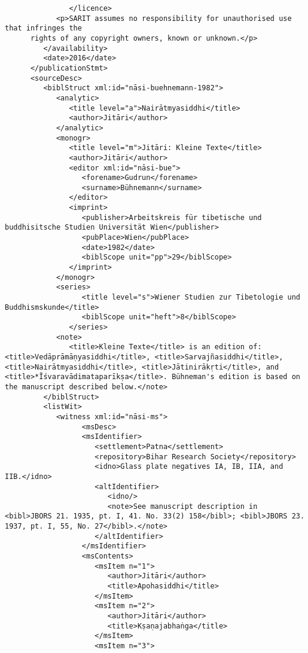 \documentclass[article,12pt,a4paper]{memoir}%
\begin{document}
\begin{verbatim}
	           </licence>
            <p>SARIT assumes no responsibility for unauthorised use that infringes the
	  rights of any copyright owners, known or unknown.</p>
         </availability>
         <date>2016</date>
      </publicationStmt>
      <sourceDesc>
         <biblStruct xml:id="nāsi-buehnemann-1982">
            <analytic>
               <title level="a">Nairātmyasiddhi</title>
               <author>Jitāri</author>
            </analytic>
            <monogr>
               <title level="m">Jitāri: Kleine Texte</title>
               <author>Jitāri</author>
               <editor xml:id="nāsi-bue">
                  <forename>Gudrun</forename> 
                  <surname>Bühnemann</surname>
               </editor>
               <imprint>
                  <publisher>Arbeitskreis für tibetische und buddhisitsche Studien Universität Wien</publisher>
                  <pubPlace>Wien</pubPlace>
                  <date>1982</date>
                  <biblScope unit="pp">29</biblScope>
               </imprint>
            </monogr>
            <series>
	              <title level="s">Wiener Studien zur Tibetologie und Buddhismskunde</title>
	              <biblScope unit="heft">8</biblScope>
	           </series>
            <note>
               <title>Kleine Texte</title> is an edition of: <title>Vedāprāmāṇyasiddhi</title>, <title>Sarvajñasiddhi</title>, <title>Nairātmyasiddhi</title>, <title>Jātinirākṛti</title>, and <title>*Īśvaravādimataparīkṣa</title>. Bühneman's edition is based on the manuscript described below.</note>
         </biblStruct>
         <listWit>
            <witness xml:id="nāsi-ms">
	              <msDesc>
                  <msIdentifier>
                     <settlement>Patna</settlement>
                     <repository>Bihar Research Society</repository>
                     <idno>Glass plate negatives IA, IB, IIA, and  IIB.</idno>
                     <altIdentifier>
                        <idno/>
                        <note>See manuscript description in <bibl>JBORS 21. 1935, pt. I, 41. No. 33(2) 158</bibl>; <bibl>JBORS 23. 1937, pt. I, 55, No. 27</bibl>.</note>
                     </altIdentifier>
                  </msIdentifier>
                  <msContents>
                     <msItem n="1">
                        <author>Jitāri</author>
                        <title>Apohasiddhi</title>
                     </msItem>
                     <msItem n="2">
                        <author>Jitāri</author>
                        <title>Kṣaṇajabhaṅga</title>
                     </msItem>
                     <msItem n="3">

\end{verbatim}
\end{document}
